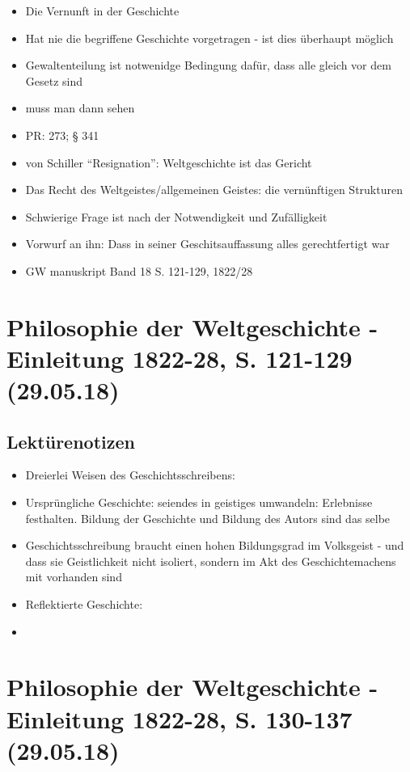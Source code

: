 \documentclass[emulatestandardclasses]{scrartcl}
\begin{document}
\begin{itemize}
  \item Die Vernunft in der Geschichte
  \item Hat nie die begriffene Geschichte vorgetragen - ist dies überhaupt möglich
  \item Gewaltenteilung ist notwenidge Bedingung dafür, dass alle gleich vor dem Gesetz sind
  \item muss man dann sehen
  \item PR: 273; § 341
  \item von Schiller "`Resignation"': Weltgeschichte ist das Gericht
  \item Das Recht des Weltgeistes/allgemeinen Geistes: die vernünftigen Strukturen
  \item Schwierige Frage ist nach der Notwendigkeit und Zufälligkeit
  \item Vorwurf an ihn: Dass in seiner Geschitsauffassung alles gerechtfertigt war
  \item GW manuskript Band 18 S. 121-129, 1822/28
\end{itemize}

\section{Philosophie der Weltgeschichte - Einleitung 1822-28, S. 121-129\\(29.05.18)}

\subsection{Lektürenotizen}

\begin{itemize}
  \item Dreierlei Weisen des Geschichtsschreibens:
  \item Ursprüngliche Geschichte: seiendes in geistiges umwandeln: Erlebnisse festhalten. Bildung der Geschichte und Bildung des Autors sind das selbe
  \item Geschichtsschreibung braucht einen hohen Bildungsgrad im Volksgeist - und dass sie Geistlichkeit nicht isoliert, sondern im Akt des Geschichtemachens mit vorhanden sind
  \item Reflektierte Geschichte:
  \item 
\end{itemize}


\section{Philosophie der Weltgeschichte - Einleitung 1822-28, S. 130-137\\(29.05.18)}
\end{document}
